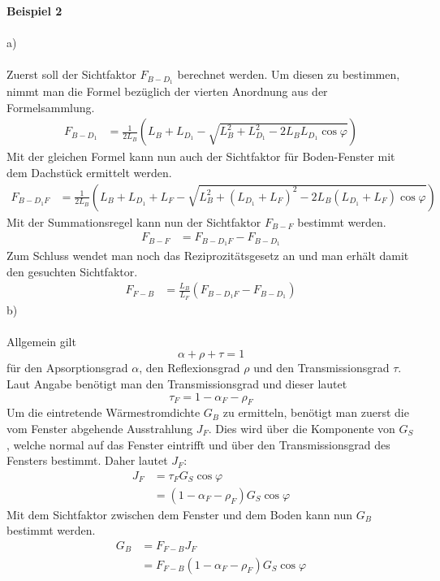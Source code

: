 \newpage
\noindent
\textbf{Beispiel 2} \\ \\
a) \\ \\
Zuerst soll der Sichtfaktor $F_{B-D_1}$ berechnet werden. Um diesen zu bestimmen, nimmt man die Formel bezüglich der vierten Anordnung aus der Formelsammlung.
\begin{align*}
	F_{B-D_1} &= \frac{1}{2L_B}\left(L_B + L_{D_1} - \sqrt{L^2_B + L^2_{D_1} - 2L_BL_{D_1}\cos\varphi}\right)
\end{align*}
Mit der gleichen Formel kann nun auch der Sichtfaktor für Boden-Fenster mit dem Dachstück ermittelt werden.
\begin{align*}
	F_{B-D_1F} &= \frac{1}{2L_B}\left(L_B + L_{D_1} + L_F - \sqrt{L^2_B + \left(L_{D_1} + L_F\right)^2 - 2L_B\left(L_{D_1} + L_F\right)\cos\varphi}\right)
\end{align*}
Mit der Summationsregel kann nun der Sichtfaktor $F_{B-F}$ bestimmt werden.
\begin{align*}
	F_{B-F} &= F_{B-D_1F} - F_{B-D_1}
\end{align*}
Zum Schluss wendet man noch das Reziprozitätsgesetz an und man erhält damit den gesuchten \newline Sichtfaktor.
\begin{align*}
	F_{F-B} &= \frac{L_B}{L_F}\left(F_{B-D_1F} - F_{B-D_1}\right)
\end{align*}
b) \\ \\ 
Allgemein gilt \[\alpha + \rho + \tau = 1\] für den Apsorptionsgrad $\alpha$, den Reflexionsgrad $\rho$ und den Transmissionsgrad $\tau$. Laut Angabe benötigt man den Transmissionsgrad und dieser lautet
\[
	\tau_F = 1 - \alpha_F - \rho_F
\]
Um die eintretende Wärmestromdichte $G_B$ zu ermitteln, benötigt man zuerst die vom Fenster abgehende Ausstrahlung $J_F$. Dies wird über die Komponente von $G_S$, welche normal auf das Fenster eintrifft und über den Transmissionsgrad des Fensters bestimmt. Daher lautet $J_F$:
\begin{align*}
	J_F &= \tau_FG_S\cos\varphi \\
		&= \left(1 - \alpha_F - \rho_F\right) G_S\cos\varphi
\end{align*}
Mit dem Sichtfaktor zwischen dem Fenster und dem Boden kann nun $G_B$ bestimmt werden.
\begin{align*}
	G_B &= F_{F-B} J_F \\
		&=  F_{F-B} \left(1 - \alpha_F - \rho_F\right) G_S\cos\varphi 
\end{align*}
